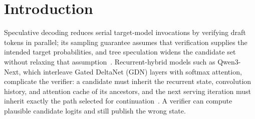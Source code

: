 \documentclass[sigconf,anonymous,review]{acmart}
\begin{document}
\section{Introduction}
Speculative decoding reduces serial target-model invocations by verifying draft tokens in parallel; its sampling guarantee assumes that verification supplies the intended target probabilities, and tree speculation widens the candidate set without relaxing that assumption~\cite{leviathan2023fast,chen2023sampling,miao2023specinfer}. Recurrent-hybrid models such as Qwen3-Next, which interleave Gated DeltaNet (GDN) layers with softmax attention, complicate the verifier: a candidate must inherit the recurrent state, convolution history, and attention cache of its ancestors, and the next serving iteration must inherit exactly the path selected for continuation~\cite{yang2024gated,wu2025stree}. A verifier can compute plausible candidate logits and still publish the wrong state.
\end{document}
